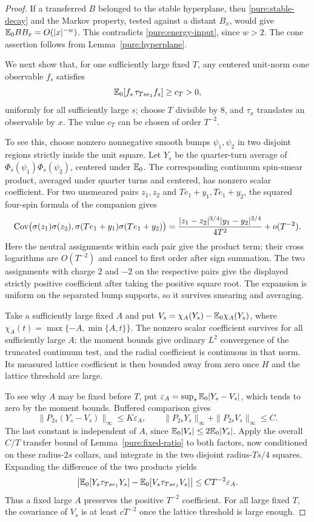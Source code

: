 \begin{proof}
If a transferred $B$ belonged to the stable hyperplane, then
\eqref{pure:stable-decay} and the Markov property, tested against a distant
$B_x$, would give $\mathbb E_0BB_x=O(|x|^{-w})$.  This contradicts
\eqref{pure:energy-input}, since $w>2$.  The cone assertion follows from
Lemma~\ref{pure:hyperplane}.

We next show that, for one sufficiently large fixed $T$, any centered
unit-norm cone observable $f_s$ satisfies
\begin{equation}
 \mathbb E_0[f_s\,\tau_{Ts e_1}f_s]\geq c_T>0,
 \label{pure:cone-pairing}
\end{equation}
uniformly for all sufficiently large $s$; choose $T$ divisible by $8$, and
$\tau_x$ translates an observable by $x$.  The value $c_T$ can be chosen
of order $T^{-2}$.

To see this, choose nonzero nonnegative smooth bumps $\psi_1,\psi_2$
in two disjoint regions strictly inside the unit square.  Let $Y_s$ be
the quarter-turn average of $\Phi_s(\psi_1)\Phi_s(\psi_2)$, centered
under $\mathbb E_0$.  The corresponding continuum spin-smear product,
averaged under quarter turns and centered, has nonzero scalar coefficient.
For two unsmeared pairs $z_1,z_2$ and $Te_1+y_1,Te_1+y_2$, the squared
four-spin formula of the companion gives
\[
 \operatorname{Cov}\bigl(\sigma(z_1)\sigma(z_2),
       \sigma(Te_1+y_1)\sigma(Te_1+y_2)\bigr)
 =\frac{|z_1-z_2|^{3/4}|y_1-y_2|^{3/4}}{4T^2}
     +o(T^{-2}).
\]
Here the neutral assignments within each pair give the product term;
their cross logarithms are $O(T^{-2})$ and cancel to first order after
sign summation.  The two assignments with charge $2$ and $-2$ on the
respective pairs give the displayed strictly positive coefficient after
taking the positive square root.  The expansion is uniform on the
separated bump supports, so it survives smearing and averaging.

Take a sufficiently large fixed $A$ and put
$V_s=\chi_A(Y_s)-\mathbb E_0\chi_A(Y_s)$, where
$\chi_A(t)=\max\{-A,\min\{A,t\}\}$.
The nonzero scalar coefficient survives for all sufficiently large $A$:
the moment bounds give ordinary $L^2$ convergence of the truncated
continuum test, and the radial coefficient is continuous in that norm.
Its measured lattice coefficient is then bounded away from zero once $H$
and the lattice threshold are large.

To see why $A$ may be fixed before $T$, put
$\varepsilon_A=\sup_s\mathbb E_0|Y_s-V_s|$, which tends to zero by the moment
bounds.  Buffered comparison gives
\[
 \|P_{2s}(Y_s-V_s)\|_\infty\leq K\varepsilon_A,\qquad
 \|P_{2s}Y_s\|_\infty+\|P_{2s}V_s\|_\infty\leq C.
\]
The last constant is independent of $A$, since
$\mathbb E_0|V_s|\leq2\mathbb E_0|Y_s|$.  Apply the overall $C/T$ transfer bound of
Lemma~\ref{pure:fixed-ratio} to both factors, now conditioned on these
radius-$2s$ collars, and integrate in the two disjoint radius-$Ts/4$
squares.  Expanding the difference of the two products yields
\[
 \bigl|\mathbb E_0[Y_s\tau_{Ts e_1}Y_s]
        -\mathbb E_0[V_s\tau_{Ts e_1}V_s]\bigr|
       \leq CT^{-2}\varepsilon_A.
\]
Thus a fixed large $A$ preserves the positive $T^{-2}$ coefficient.
For all large fixed $T$, the covariance of $V_s$ is at least $cT^{-2}$
once the lattice threshold is large enough.


\end{proof}
